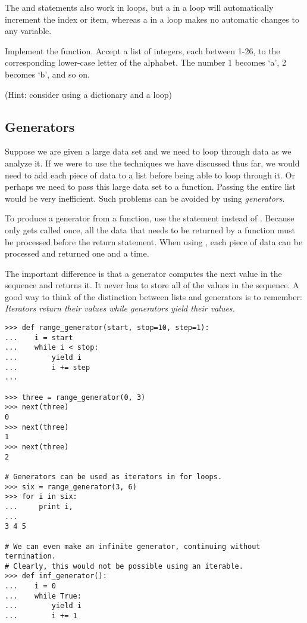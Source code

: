 The  and  statements also work in  loops, but a  in a  loop will automatically increment the index or item, whereas a  in a  loop makes no automatic changes to any variable.

\begin{problem}
Implement the  function. Accept a list  of integers, each between 1-26, to the corresponding lower-case letter of the alphabet.
The number 1 becomes `a', 2 becomes `b', and so on.

(Hint: consider using a dictionary and a loop)
\end{problem}


\subsection*{Generators}

Suppose we are given a large data set and we need to loop through data as we analyze it.
If we were to use the techniques we have discussed thus far, we would need to add each piece of data to a list before being able to loop through it.
Or perhaps we need to pass this large data set to a function.
Passing the entire list would be very inefficient.
Such problems can be avoided by using \emph{generators}.

To produce a generator from a function, use the  statement instead of .
Because  only gets called once, all the data that needs to be returned by a function must be processed before the return statement.
When using , each piece of data can be processed and returned one and a time.

The important difference is that a generator computes the next value in the sequence and returns it. It never has to store all of the values in the sequence. A good way to think of the distinction between lists and generators is to remember: \emph{Iterators return their values while generators yield their values.}

\begin{lstlisting}
>>> def range_generator(start, stop=10, step=1):
...    i = start
...    while i < stop:
...        yield i 
...        i += step
...

>>> three = range_generator(0, 3)
>>> next(three)
0
>>> next(three)
1
>>> next(three)
2

# Generators can be used as iterators in for loops.
>>> six = range_generator(3, 6)
>>> for i in six:
...     print i,
...
3 4 5

# We can even make an infinite generator, continuing without termination.
# Clearly, this would not be possible using an iterable.
>>> def inf_generator():
...    i = 0
...    while True:
...        yield i
...        i += 1
\end{lstlisting}

